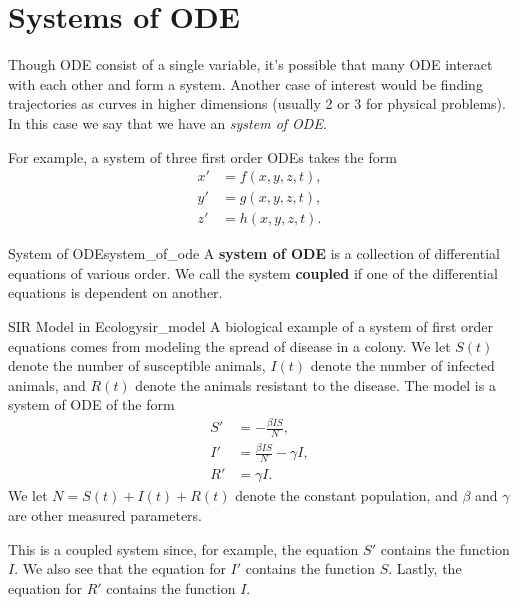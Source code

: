    \chapter{Systems of ODE}
        Though ODE consist of a single variable, it's possible that many ODE interact with each other and form a system.  Another case of interest would be finding trajectories as curves in higher dimensions (usually 2 or 3 for physical problems).  In this case we say that we have an \emph{system of ODE}.  
        
        For example, a system of three first order ODEs takes the form
        \begin{align*}
            x' &= f(x,y,z,t),\\
            y' &= g(x,y,z,t),\\
            z' &= h(x,y,z,t).
        \end{align*}
        
        \begin{df}{System of ODE}{system_of_ode}
            A \textbf{system of ODE} is a collection of differential equations of various order.  We call the system \textbf{coupled} if one of the differential equations is dependent on another.
        \end{df}
        
        \begin{ex}{SIR Model in Ecology}{sir_model}
        A biological example of a system of first order equations comes from modeling the spread of disease in a colony.  We let $S(t)$ denote the number of susceptible animals, $I(t)$ denote the number of infected animals, and $R(t)$ denote the animals resistant to the disease.  The model is a system of ODE of the form
        \begin{align*}
            S' &= -\frac{\beta IS}{N},\\
            I' &= \frac{\beta I S}{N} - \gamma I,\\
            R' &= \gamma I.
        \end{align*}
        We let $N=S(t)+I(t)+R(t)$ denote the constant population, and $\beta$ and $\gamma$ are other measured parameters.
        
        This is a coupled system since, for example, the equation $S'$ contains the function $I$.  We also see that the equation for $I'$ contains the function $S$.  Lastly, the equation for $R'$ contains the function $I$.  
        \end{ex}
        
 
        
